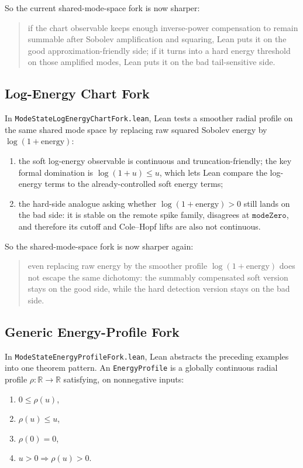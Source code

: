\documentclass[11pt]{article}
\begin{document}
So the current shared-mode-space fork is now sharper:
\begin{quote}
if the chart observable keeps enough inverse-power compensation to remain
summable after Sobolev amplification and squaring, Lean puts it on the good
approximation-friendly side; if it turns into a hard energy threshold on those
amplified modes, Lean puts it on the bad tail-sensitive side.
\end{quote}

\subsection{Log-Energy Chart Fork}

In \texttt{ModeStateLogEnergyChartFork.lean}, Lean tests a smoother radial
profile on the same shared mode space by replacing raw squared Sobolev energy by
\(\log(1+\mathrm{energy})\):
\begin{enumerate}[leftmargin=1.5em]
  \item the soft log-energy observable is continuous and truncation-friendly;
  the key formal domination is \(\log(1+u) \le u\), which lets Lean compare the
  log-energy terms to the already-controlled soft energy terms;
  \item the hard-side analogue asking whether \(\log(1+\mathrm{energy}) > 0\)
  still lands on the bad side: it is stable on the remote spike family,
  disagrees at \(\texttt{modeZero}\), and therefore its cutoff and Cole--Hopf
  lifts are also not continuous.
\end{enumerate}

So the shared-mode-space fork is now sharper again:
\begin{quote}
even replacing raw energy by the smoother profile \(\log(1+\mathrm{energy})\)
does not escape the same dichotomy: the summably compensated soft version stays
on the good side, while the hard detection version stays on the bad side.
\end{quote}

\subsection{Generic Energy-Profile Fork}

In \texttt{ModeStateEnergyProfileFork.lean}, Lean abstracts the preceding
examples into one theorem pattern.  An \texttt{EnergyProfile} is a globally
continuous radial profile \(\rho : \mathbb{R} \to \mathbb{R}\) satisfying, on
nonnegative inputs:
\begin{enumerate}[leftmargin=1.5em]
  \item \(0 \le \rho(u)\),
  \item \(\rho(u) \le u\),
  \item \(\rho(0)=0\),
  \item \(u>0 \Rightarrow \rho(u)>0\).
\end{enumerate}
\end{document}
